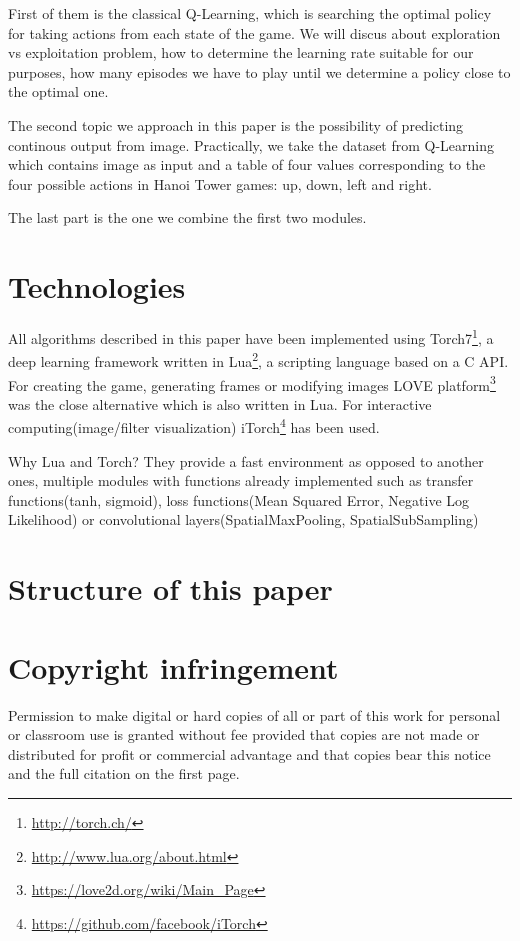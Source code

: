First of them is the classical Q-Learning, which is searching the optimal policy for taking actions from each state of the game. We will discus about exploration vs exploitation problem, how to determine the learning rate suitable for our purposes, how many episodes we have to play until we determine a policy close to the optimal one.

The second topic we approach in this paper is the possibility of predicting continous output from image. Practically, we take the dataset from Q-Learning which contains image as input and a table of four values corresponding to the four possible actions in Hanoi Tower games: up, down, left and right.

The last part is the one we combine the first two modules.

\section{Technologies}
\label{sec:technologies}
All algorithms described in this paper have been implemented using Torch7\footnote{\url{http://torch.ch/}}, a deep learning framework written in Lua\footnote{\url{http://www.lua.org/about.html}}, a scripting language based on a C API. For creating the game, generating frames or modifying images LOVE platform\footnote{\url{https://love2d.org/wiki/Main_Page}} was the close alternative which is also written in Lua. For interactive computing(image/filter visualization) iTorch\footnote{\url{https://github.com/facebook/iTorch}} has been used.

Why Lua and Torch? They provide a fast environment as opposed to another ones\cite{torch7}, multiple modules with functions already implemented such as transfer functions(tanh, sigmoid), loss functions(Mean Squared Error, Negative Log Likelihood) or convolutional layers(SpatialMaxPooling, SpatialSubSampling)

\section{Structure of this paper}
\label{sec:paper_structure}






\section{Copyright infringement}
\label{sec:copyright}
Permission to make digital or hard copies of all or part of this work for personal or classroom use is granted without fee provided that copies are not made or distributed for profit or commercial advantage and that copies bear this notice and the full citation on the first page. 







